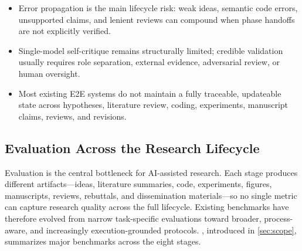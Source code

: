 \documentclass{llmxive}
\providecommand{\anadotrule}{\par\vspace{2pt}\noindent\dotfill\par\vspace{2pt}}
\begin{document}
{}{%

\begin{itemize}[leftmargin=8pt, itemsep=0pt, topsep=0pt, parsep=0pt]

\item Error propagation is the main lifecycle risk: weak ideas, semantic code errors, unsupported claims, and lenient reviews can compound when phase handoffs are not explicitly verified.

\end{itemize}

\anadotrule

\begin{itemize}[leftmargin=8pt, itemsep=0pt, topsep=0pt, parsep=0pt]

\item Single-model self-critique remains structurally limited; credible validation usually requires role separation, external evidence, adversarial review, or human oversight.

\end{itemize}

\anadotrule

\begin{itemize}[leftmargin=8pt, itemsep=0pt, topsep=0pt, parsep=0pt]

\item Most existing E2E systems do not maintain a fully traceable, updateable state across hypotheses, literature review, coding, experiments, manuscript claims, reviews, and revisions.
\end{itemize}
}
\vspace{8pt}




\subsection{Evaluation Across the Research Lifecycle}
\label{sec:lifecycle_eval}

Evaluation is the central bottleneck for AI-assisted research. Each stage produces different artifacts---ideas, literature summaries, code, experiments, figures, manuscripts, reviews, rebuttals, and dissemination materials---so no single metric can capture research quality across the full lifecycle. Existing benchmarks have therefore evolved from narrow task-specific evaluations toward broader, process-aware, and increasingly execution-grounded protocols. 
, introduced in \cref{sec:scope}, summarizes major benchmarks across the eight stages.
\end{document}
